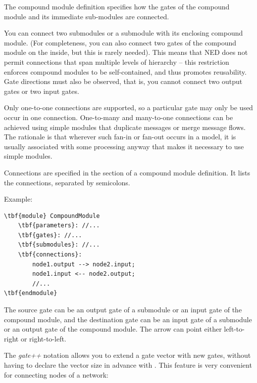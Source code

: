 The compound module definition specifies how the gates of the compound
module and its immediate sub-modules are connected.

You can connect two submodules or a submodule with its enclosing
compound module. (For completeness, you can also connect two gates
of the compound module on the inside, but this is rarely needed).
This means that NED does not permit connections that span
multiple levels of hierarchy -- this restriction
enforces compound modules to be self-contained, and thus promotes
reusability. Gate directions must also be observed,
that is, you cannot connect two output gates or two input gates.

Only one-to-one connections are supported, so a particular gate may only
be used occur in one connection. One-to-many and many-to-one
connections can be achieved using simple modules that duplicate
messages or merge message flows. The rationale is that wherever
such fan-in or fan-out occurs in a model, it is usually associated
with some processing anyway that makes it necessary to use
simple modules.

Connections are specified in the
 section of a compound
module definition. It lists the connections, separated by semicolons.

Example:

\begin{Verbatim}[commandchars=\\\{\}]
\tbf{module} CompoundModule
    \tbf{parameters}: //...
    \tbf{gates}: //...
    \tbf{submodules}: //...
    \tbf{connections}:
        node1.output --> node2.input;
        node1.input <-- node2.output;
        //...
\tbf{endmodule}
\end{Verbatim}

The source gate can be an output gate of a submodule or an input
gate of the compound module, and the destination gate can be
an input gate of a submodule or an output gate of the compound
module. The arrow can point either left-to-right or right-to-left.

The \textit{gate++} notation allows you to extend a gate vector
with new gates, without having to declare the vector size in advance
with . This feature is very convenient for connecting
nodes of a network:

